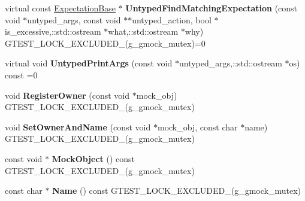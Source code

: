 \begin{DoxyCompactItemize}
\item 
virtual const \hyperlink{classtesting_1_1internal_1_1ExpectationBase}{Expectation\+Base} $\ast$ {\bfseries Untyped\+Find\+Matching\+Expectation} (const void $\ast$untyped\+\_\+args, const void $\ast$$\ast$untyped\+\_\+action, bool $\ast$is\+\_\+excessive,\+::std\+::ostream $\ast$what,\+::std\+::ostream $\ast$why) G\+T\+E\+S\+T\+\_\+\+L\+O\+C\+K\+\_\+\+E\+X\+C\+L\+U\+D\+E\+D\+\_\+(g\+\_\+gmock\+\_\+mutex)=0\hypertarget{classtesting_1_1internal_1_1UntypedFunctionMockerBase_a6461abd05786eee4e125a2695382852d}{}\label{classtesting_1_1internal_1_1UntypedFunctionMockerBase_a6461abd05786eee4e125a2695382852d}

\item 
virtual void {\bfseries Untyped\+Print\+Args} (const void $\ast$untyped\+\_\+args,\+::std\+::ostream $\ast$os) const =0\hypertarget{classtesting_1_1internal_1_1UntypedFunctionMockerBase_a3bd7439b411fc00f7d9f9a6f9591ae2c}{}\label{classtesting_1_1internal_1_1UntypedFunctionMockerBase_a3bd7439b411fc00f7d9f9a6f9591ae2c}

\item 
void {\bfseries Register\+Owner} (const void $\ast$mock\+\_\+obj) G\+T\+E\+S\+T\+\_\+\+L\+O\+C\+K\+\_\+\+E\+X\+C\+L\+U\+D\+E\+D\+\_\+(g\+\_\+gmock\+\_\+mutex)\hypertarget{classtesting_1_1internal_1_1UntypedFunctionMockerBase_a0cd3dd14b92c714eab690c9597f32ffd}{}\label{classtesting_1_1internal_1_1UntypedFunctionMockerBase_a0cd3dd14b92c714eab690c9597f32ffd}

\item 
void {\bfseries Set\+Owner\+And\+Name} (const void $\ast$mock\+\_\+obj, const char $\ast$name) G\+T\+E\+S\+T\+\_\+\+L\+O\+C\+K\+\_\+\+E\+X\+C\+L\+U\+D\+E\+D\+\_\+(g\+\_\+gmock\+\_\+mutex)\hypertarget{classtesting_1_1internal_1_1UntypedFunctionMockerBase_a287bcacee639b7d123cec29e0614fe96}{}\label{classtesting_1_1internal_1_1UntypedFunctionMockerBase_a287bcacee639b7d123cec29e0614fe96}

\item 
const void $\ast$ {\bfseries Mock\+Object} () const G\+T\+E\+S\+T\+\_\+\+L\+O\+C\+K\+\_\+\+E\+X\+C\+L\+U\+D\+E\+D\+\_\+(g\+\_\+gmock\+\_\+mutex)\hypertarget{classtesting_1_1internal_1_1UntypedFunctionMockerBase_a42da5a85136c72edb72d65e6dba35cec}{}\label{classtesting_1_1internal_1_1UntypedFunctionMockerBase_a42da5a85136c72edb72d65e6dba35cec}

\item 
const char $\ast$ {\bfseries Name} () const G\+T\+E\+S\+T\+\_\+\+L\+O\+C\+K\+\_\+\+E\+X\+C\+L\+U\+D\+E\+D\+\_\+(g\+\_\+gmock\+\_\+mutex)\hypertarget{classtesting_1_1internal_1_1UntypedFunctionMockerBase_a9fb89b093709f0f04e2c0d90eb93c2d1}{}\label{classtesting_1_1internal_1_1UntypedFunctionMockerBase_a9fb89b093709f0f04e2c0d90eb93c2d1}


\end{DoxyCompactItemize}
